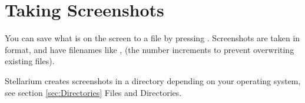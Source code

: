 \section{Taking Screenshots}
\label{sec:tour:screenshots}

You can save what is on the screen to a file by pressing
. Screenshots are taken in  format, and
have filenames like ,
 (the number increments to prevent
overwriting existing files).

Stellarium creates screenshots in a directory depending on
your operating system, see section
\ref{sec:Directories} Files and Directories.







